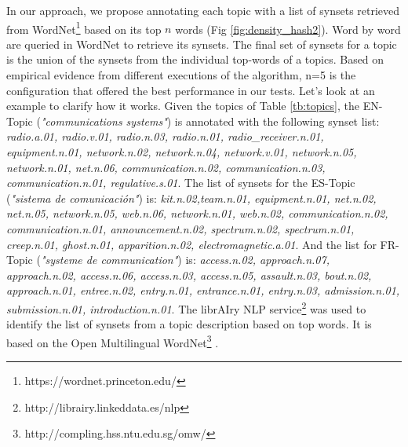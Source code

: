 In our approach, we propose annotating each topic with a list of synsets \citep{Bond2013} retrieved from WordNet\footnote{https://wordnet.princeton.edu/}\citep{Miller1995WordNet:English} based on its top $n$ words (Fig \ref{fig:density_hash2}). Word by word are queried in WordNet to retrieve its synsets. The final set of synsets for a topic is the union of the synsets from the individual top-words of a topics. Based on empirical evidence from different executions of the algorithm, n=5 is the configuration that offered the best performance in our tests. Let's look at an example to clarify how it works. Given the topics of Table \ref{tb:topics}, the EN-Topic (\textit{"communications systems"}) is annotated with the following synset list: \textit{radio.a.01, radio.v.01, radio.n.03, radio.n.01, radio\_receiver.n.01, equipment.n.01, network.n.02, network.n.04, network.v.01, network.n.05, network.n.01, net.n.06, communication.n.02, communication.n.03, communication.n.01, regulative.s.01}. The list of synsets for the ES-Topic (\textit{"sistema de comunicaci\'on"}) is:  \textit{kit.n.02,team.n.01, equipment.n.01, net.n.02, net.n.05, network.n.05, web.n.06, network.n.01, web.n.02, communication.n.02, communication.n.01, announcement.n.02, spectrum.n.02, spectrum.n.01, creep.n.01, ghost.n.01, apparition.n.02, electromagnetic.a.01}. And the list for FR-Topic (\textit{"systeme de communication"}) is:  \textit{access.n.02, approach.n.07, approach.n.02, access.n.06, access.n.03, access.n.05, assault.n.03, bout.n.02, approach.n.01, entree.n.02, entry.n.01, entrance.n.01, entry.n.03, admission.n.01, submission.n.01, introduction.n.01}. The librAIry NLP service\footnote{http://librairy.linkeddata.es/nlp} was used to identify the list of synsets from a topic description based on top words. It is based on the Open Multilingual WordNet\footnote{http://compling.hss.ntu.edu.sg/omw/} \citep{Bond2012}.

